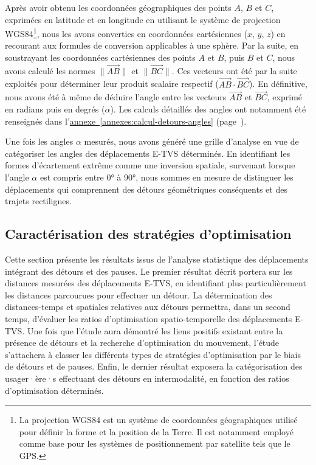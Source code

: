 \begin{refsegment}
Après avoir obtenu les coordonnées géographiques des points \(A\), \(B\) et \(C\), exprimées en latitude et en longitude en utilisant le système de projection \acrshort{WGS84}\footnote{
La projection \acrfull{WGS84} est un système de coordonnées géographiques utilisé pour définir la forme et la position de la Terre. Il est notamment employé comme base pour les systèmes de positionnement par satellite tels que le \acrfull{GPS}.
}, nous les avons converties en coordonnées cartésiennes (\(x\), \(y\), \(z\)) en recourant aux formules de conversion applicables à une sphère. Par la suite, en soustrayant les coordonnées cartésiennes des points \(A\) et \(B\), puis \(B\) et \(C\), nous avons calculé les normes $\lVert \vec{AB} \rVert$ et $\lVert \vec{BC} \rVert$. Ces vecteurs ont été par la suite exploités pour déterminer leur produit scalaire respectif ($\vec{AB} \cdot \vec{BC}$). En définitive, nous avons été à même de déduire l'angle entre les vecteurs $\vec{AB}$ et $\vec{BC}$, exprimé en radians puis en degrés ($\alpha$). Les calculs détaillés des angles ont notamment été renseignés dans l'\hyperref[annexes:calcul-detours-angles]{annexe~\ref{annexes:calcul-detours-angles}} (page~\pageref{annexes:calcul-detours-angles}).%

Une fois les angles $\alpha$ mesurés, nous avons généré une grille d'analyse en vue de catégoriser les angles des déplacements \acrshort{E-TVS} déterminés. En identifiant les formes d'écartement extrême comme une inversion spatiale, survenant lorsque l'angle $\alpha$ est compris entre 0° à 90°, nous sommes en mesure de distinguer les déplacements qui comprennent des détours géométriques conséquents et des trajets rectilignes.%

\subsection{Caractérisation des stratégies d'optimisation
    \label{chap5:strategies-optimisation}
    }

Cette section présente les résultats issus de l'analyse statistique des déplacements intégrant des détours et des pauses. Le premier résultat décrit portera sur les distances mesurées des déplacements \acrshort{E-TVS}, en identifiant plus particulièrement les distances parcourues pour effectuer un détour. La détermination des distances-temps et spatiales relatives aux détours permettra, dans un second temps, d'évaluer les ratios d'optimisation spatio-temporelle des déplacements \acrshort{E-TVS}. Une fois que l'étude aura démontré les liens positifs existant entre la présence de détours et la recherche d'optimisation du mouvement, l'étude s'attachera à classer les différents types de stratégies d'optimisation par le biais de détours et de pauses. Enfin, le dernier résultat exposera la catégorisation des usager·ère·s effectuant des détours en intermodalité, en fonction des ratios d'optimisation déterminés.%


\end{refsegment}
